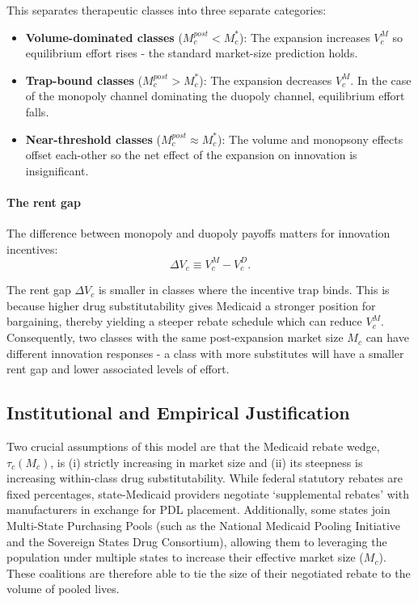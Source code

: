 \documentclass[12pt]{article}
\begin{document}
This separates therapeutic classes into three separate categories:

\begin{itemize}
    \item \textbf{Volume-dominated classes} ($M_c^{post} < M_c^*$): The expansion increases $V_c^M$ so equilibrium effort rises - the standard market-size prediction holds.

    \item \textbf{Trap-bound classes} ($M_c^{post} > M_c^*$): The expansion decreases $V_c^M$. In the case of the monopoly channel dominating the duopoly channel, equilibrium effort falls.

    \item \textbf{Near-threshold classes} ($M_c^{post} \approx M_c^*$): The volume and monopsony effects offset each-other so the net effect of the expansion on innovation is insignificant.
\end{itemize}

\paragraph{The rent gap}
The difference between monopoly and duopoly payoffs matters for innovation incentives:
\begin{equation}
    \Delta V_c \equiv V_c^M - V_c^D .
\end{equation}

The rent gap $\Delta V_c$ is smaller in classes where the incentive trap binds. This is because higher drug substitutability gives Medicaid a stronger position for bargaining, thereby yielding a steeper rebate schedule which can reduce $V_c^M$. Consequently, two classes with the same post-expansion market size $M_c$ can have different innovation responses - a class with more substitutes will have a smaller rent gap and lower associated levels of effort.

\subsection{Institutional and Empirical Justification}
Two crucial assumptions of this model are that the Medicaid rebate wedge, $\tau_c(M_c)$, is (i) strictly increasing in market size and (ii) its steepness is increasing within-class drug substitutability. While federal statutory rebates are fixed percentages, state-Medicaid providers negotiate `supplemental rebates' with manufacturers in exchange for PDL placement. Additionally, some states join Multi-State Purchasing Pools (such as the National Medicaid Pooling Initiative and the Sovereign States Drug Consortium), allowing them to leveraging the population under multiple states to increase their effective market size ($M_c$). These coalitions are therefore able to tie the size of their negotiated rebate to the volume of pooled lives.
\end{document}
